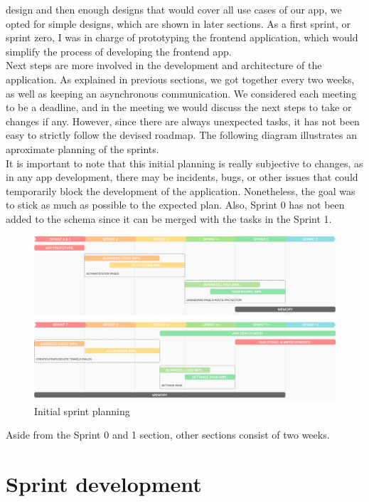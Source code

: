 \documentclass[../memory.tex]{subfiles}
\begin{document}
design and then enough designs that would cover all use cases of our app, we
opted for simple designs, which are shown in later sections. As a first sprint,
or sprint zero, I was in charge of prototyping the frontend application, which
would simplify the process of developing the frontend app.
\\[8pt]
Next steps are more involved in the development and architecture of the
application. As explained in previous sections, we got together every two weeks,
as well as keeping an asynchronous communication. We considered each meeting to
be a deadline, and in the meeting we would discuss the next steps to take or
changes if any. However, since there are always unexpected tasks, it has not
been easy to strictly follow the devised roadmap. The following diagram
illustrates an aproximate planning of the sprints.
\\
It is important to note that this initial planning is really subjective to
changes, as in any app development, there may be incidents, bugs, or other
issues that could temporarily block the development of the application.
Nonetheless, the goal was to stick as much as possible to the expected plan.
Also, Sprint 0 has not been added to the schema since it can be merged with the
tasks in the Sprint 1.
\begin{figure}[H]
	\centering
	\includegraphics[width=\textwidth]{./assets/roadmap.png}
	\caption{Initial sprint planning}
\end{figure}
Aside from the Sprint 0 and 1 section, other sections consist of two weeks.
\section{Sprint development}
\end{document}

